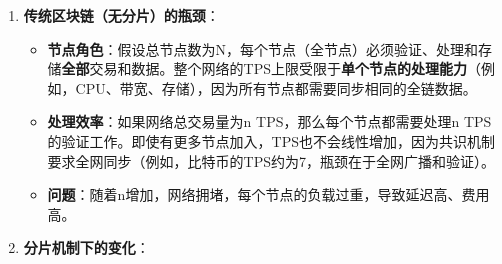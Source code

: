 \documentclass[a4paper,12pt]{ctexart}
\begin{document}
\begin{enumerate}
    \item \textbf{传统区块链（无分片）的瓶颈}：
    \begin{itemize}
        \item \textbf{节点角色}：假设总节点数为N，每个节点（全节点）必须验证、处理和存储\textbf{全部}交易和数据。整个网络的TPS上限受限于\textbf{单个节点的处理能力}（例如，CPU、带宽、存储），因为所有节点都需要同步相同的全链数据。
        \item \textbf{处理效率}：如果网络总交易量为n TPS，那么每个节点都需要处理n TPS的验证工作。即使有更多节点加入，TPS也不会线性增加，因为共识机制要求全网同步（例如，比特币的TPS约为7，瓶颈在于全网广播和验证）。
        \item \textbf{问题}：随着n增加，网络拥堵，每个节点的负载过重，导致延迟高、费用高。
    \end{itemize}
    \item \textbf{分片机制下的变化}：
    

\end{enumerate}
\end{document}
